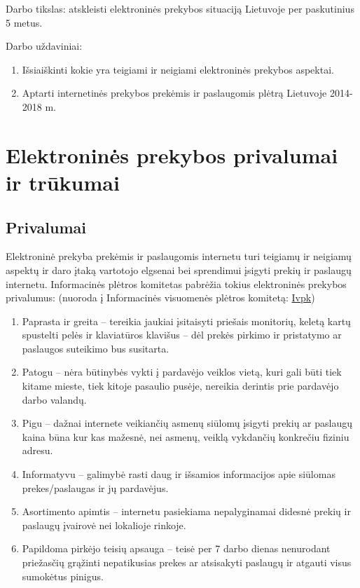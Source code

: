 \documentclass[12pt, titlepage]{article}
\begin{document}
\smallskip
\par
\noindent
Darbo tikslas: atskleisti elektroninės prekybos situaciją Lietuvoje per paskutinius 5 metus.
\smallskip
\par
\noindent
Darbo uždaviniai:
\begin{enumerate}
\item Išsiaiškinti kokie yra teigiami ir neigiami elektroninės prekybos aspektai.
\item Aptarti internetinės prekybos prekėmis ir paslaugomis plėtrą Lietuvoje 2014-2018 m.
\end{enumerate}
\newpage
\section{Elektroninės prekybos privalumai ir trūkumai}
\subsection{Privalumai}
\smallskip
\par
\hspace{\parindent}
Elektroninė prekyba prekėmis ir paslaugomis internetu turi teigiamų ir neigiamų aspektų ir daro įtaką vartotojo elgsenai bei sprendimui įsigyti prekių ir paslaugų internetu. Informacinės plėtros komitetas pabrėžia tokius elektroninės prekybos privalumus: (nuoroda į Informacinės visuomenės plėtros komitetą: \href{https://ivpk.lrv.lt} {Ivpk})
\smallskip
\begin{enumerate}
\item Paprasta ir greita – tereikia jaukiai įsitaisyti priešais monitorių, keletą kartų spustelti pelės ir klaviatūros klavišus – dėl prekės pirkimo ir pristatymo ar paslaugos suteikimo bus susitarta.
\item Patogu – nėra būtinybės vykti į pardavėjo veiklos vietą, kuri gali būti tiek kitame mieste, tiek kitoje pasaulio pusėje, nereikia derintis prie pardavėjo darbo valandų.
\item Pigu – dažnai internete veikiančių asmenų siūlomų įsigyti prekių ar paslaugų kaina būna kur kas mažesnė, nei asmenų, veiklą vykdančių konkrečiu fiziniu adresu.
\item Informatyvu – galimybė rasti daug ir išsamios informacijos apie siūlomas prekes/paslaugas ir jų pardavėjus.
\item Asortimento apimtis – internetu pasiekiama nepalyginamai didesnė prekių ir paslaugų įvairovė nei lokalioje rinkoje.
\item Papildoma pirkėjo teisių apsauga – teisė per 7 darbo dienas nenurodant priežasčių grąžinti nepatikusias prekes ar atsisakyti paslaugų ir atgauti visus sumokėtus pinigus.
\end{enumerate}
\end{document}
